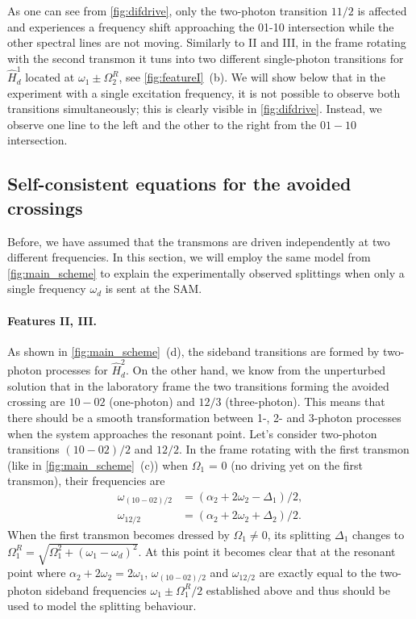 \documentclass[%
 pra,
 amsmath,amssymb,
 reprint,%
]{revtex4-1}
\begin{document}
As one can see from \autoref{fig:difdrive}, only the two-photon transition $11/2$ is affected and experiences a frequency shift approaching the 01-10 intersection while the other spectral lines are not moving. Similarly to II and III, in the frame rotating with the second transmon it tuns into two different single-photon transitions for $\hat H_d^1$ located at $\omega_1 \pm \Omega_2^R$, see \autoref{fig:featureI}~(b). We will show below that in the experiment with a single excitation frequency, it is not possible to observe both transitions simultaneously; this is clearly visible in \autoref{fig:difdrive}. Instead, we observe one line to the left and the other to the right from the $01-10$ intersection.




\subsection{Self-consistent equations for the avoided crossings}
\label{sec:münchhausen}

Before, we have assumed that the transmons are driven independently at two different frequencies. In this section, we will employ the same model from \autoref{fig:main_scheme} to explain the experimentally observed splittings when only a single frequency $\omega_d$ is sent at the SAM. 

\paragraph{Features II, III.}As shown in 
\autoref{fig:main_scheme}~(d), the sideband 
transitions are formed by two-photon processes 
for $\hat H_d^2$. On the other hand, we know from 
the unperturbed solution that in the laboratory 
frame the two transitions forming the avoided 
crossing are $10 - 02$ (one-photon) and $12/3$ 
(three-photon). This means that there should be a 
smooth transformation between 1-, 2- and 3-photon 
processes when the system approaches the resonant 
point. Let's consider two-photon transitions $(10 
- 02)/2$ and $12/2$. In the frame rotating with 
the first transmon (like in 
\autoref{fig:main_scheme}~(c)) when $\Omega_1$ = 
0 (no driving yet on the first transmon), their 
frequencies are
\begin{equation}
\begin{aligned}
\omega_{(10-02)/2} &= (\alpha_2 + 2 \omega_{2} - \Delta_1)/2,\\
 \omega_{12/2} &= (\alpha_2 + 2 \omega_{2} + \Delta_2)/2.
\end{aligned}
\end{equation}
When the first transmon becomes dressed by $\Omega_1 \neq 0$, its splitting $\Delta_1$ changes to $\Omega^R_1 =\sqrt{\Omega_{1}^2 + \left(\omega_{1} - \omega_{d}\right)^{2}}$. At this point it becomes clear that at the resonant point where $\alpha_2 + 2 \omega_{2} = 2\omega_1$, $\omega_{(10-02)/2}$ and $\omega_{12/2}$ are exactly equal to the two-photon sideband frequencies $\omega_1 \pm \Omega_1^R/2$ established above and thus should be used to model the splitting behaviour.
\end{document}
